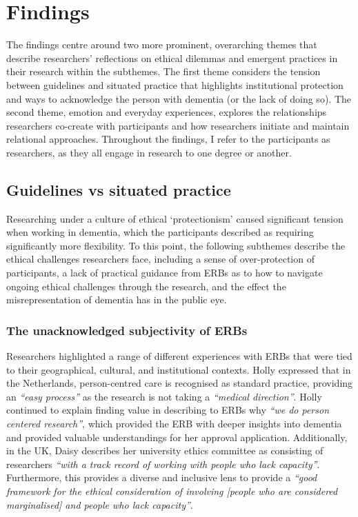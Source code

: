 \section{Findings}
\label{Ethics:Findings}
The findings centre around two more prominent, overarching themes that describe researchers’ reflections on ethical dilemmas and emergent practices in their research within the subthemes. The first theme considers the tension between guidelines and situated practice that highlights institutional protection and ways to acknowledge the person with dementia (or the lack of doing so). The second theme, emotion and everyday experiences, explores the relationships researchers co-create with participants and how researchers initiate and maintain relational approaches. Throughout the findings, I refer to the participants as researchers, as they all engage in research to one degree or another.

\subsection{Guidelines vs situated practice}
\label{Ethics:ThemeOne}
Researching under a culture of ethical `protectionism' caused significant tension when working in dementia, which the participants described as requiring significantly more flexibility. To this point, the following subthemes describe the ethical challenges researchers face, including a sense of over-protection of participants, a lack of practical guidance from ERBs as to how to navigate ongoing ethical challenges through the research, and the effect the misrepresentation of dementia has in the public eye.

\subsubsection{The unacknowledged subjectivity of ERBs}
\label{Ethics:ThemOnePartOne}
Researchers highlighted a range of different experiences with ERBs that were tied to their geographical, cultural, and institutional contexts. Holly expressed that in the Netherlands, person-centred care is recognised as standard practice, providing an \textit{``easy process''} as the research is not taking a \textit{``medical direction''}. Holly continued to explain finding value in describing to ERBs why \textit{``we do person centered research''}, which provided the ERB with deeper insights into dementia and provided valuable understandings for her approval application. Additionally, in the UK, Daisy describes her university ethics committee as consisting of researchers \textit{``with a track record of working with people who lack capacity''}. Furthermore, this provides a diverse and inclusive lens to provide a \textit{``good framework for the ethical consideration of involving [people who are considered marginalised] and people who lack capacity''}. 

